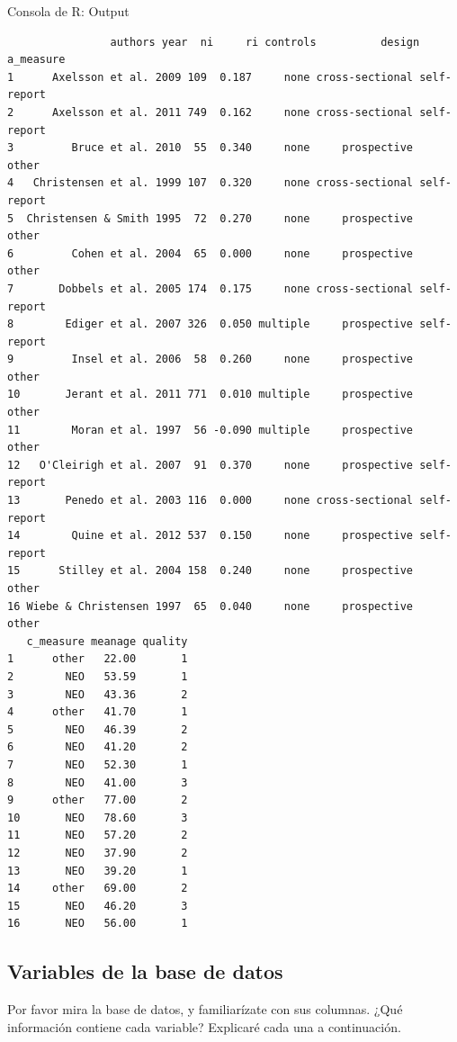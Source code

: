 \documentclass[
  bookmarksnumbered]{article}
\begin{document}
\begin{ROut}{Consola de R: Output~\thetcbcounter}
                \begin{footnotesize}
                \begin{verbatim}                authors year  ni     ri controls          design   a_measure
1      Axelsson et al. 2009 109  0.187     none cross-sectional self-report
2      Axelsson et al. 2011 749  0.162     none cross-sectional self-report
3         Bruce et al. 2010  55  0.340     none     prospective       other
4   Christensen et al. 1999 107  0.320     none cross-sectional self-report
5  Christensen & Smith 1995  72  0.270     none     prospective       other
6         Cohen et al. 2004  65  0.000     none     prospective       other
7       Dobbels et al. 2005 174  0.175     none cross-sectional self-report
8        Ediger et al. 2007 326  0.050 multiple     prospective self-report
9         Insel et al. 2006  58  0.260     none     prospective       other
10       Jerant et al. 2011 771  0.010 multiple     prospective       other
11        Moran et al. 1997  56 -0.090 multiple     prospective       other
12   O'Cleirigh et al. 2007  91  0.370     none     prospective self-report
13       Penedo et al. 2003 116  0.000     none cross-sectional self-report
14        Quine et al. 2012 537  0.150     none     prospective self-report
15      Stilley et al. 2004 158  0.240     none     prospective       other
16 Wiebe & Christensen 1997  65  0.040     none     prospective       other
   c_measure meanage quality
1      other   22.00       1
2        NEO   53.59       1
3        NEO   43.36       2
4      other   41.70       1
5        NEO   46.39       2
6        NEO   41.20       2
7        NEO   52.30       1
8        NEO   41.00       3
9      other   77.00       2
10       NEO   78.60       3
11       NEO   57.20       2
12       NEO   37.90       2
13       NEO   39.20       1
14     other   69.00       2
15       NEO   46.20       3
16       NEO   56.00       1
 \end{verbatim}
                \end{footnotesize}
                \end{ROut}

\hypertarget{variables-de-la-base-de-datos}{%
\subsection{Variables de la base de datos}\label{variables-de-la-base-de-datos}}

Por favor mira la base de datos, y familiarízate con sus columnas. ¿Qué información contiene cada variable? Explicaré cada una a continuación.
\end{document}
